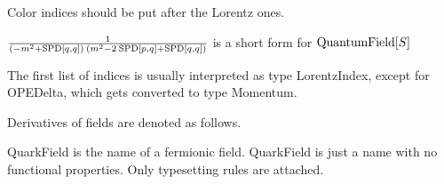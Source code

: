 Color indices should be put after the Lorentz ones.





\(\frac{1}{(-{m^2}+\mathrm{SPD}[q,q])\> ({m^2}-2\> \mathrm{SPD}[p,q]+\mathrm{SPD}[q,q])}\) is a short form for \(\mathrm{QuantumField}[S]\)




 The first list of indices is usually interpreted as type LorentzIndex, except for OPEDelta, which gets converted to type Momentum. 

\dispSFinmath{
\overvar{\psi }{\_}
}


Derivatives of fields are denoted as follows.

\dispSFinmath{
\psi 
}












QuarkField is the name of a fermionic field. QuarkField is just a name with no functional properties. Only typesetting rules are
  attached.

